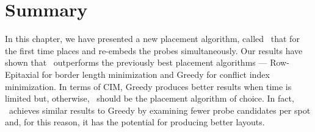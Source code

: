 \section{Summary}
\label{sec:merge_summary}

In this chapter, we have presented a new placement algorithm, called
\Greedyplus\ that for the first time places and re-embeds the probes
simultaneously. Our results have shown that \Greedyplus\ outperforms the
previously best placement algorithms --- Row-Epitaxial for border length
minimization and Greedy for conflict index minimization. In terms of CIM,
Greedy produces better results when time is limited but, otherwise, \Greedyplus\
should be the placement algorithm of choice. In fact, \Greedyplus\ achieves
similar results to Greedy by examining fewer probe candidates per spot and, for
this reason, it has the potential for producing better layouts.
